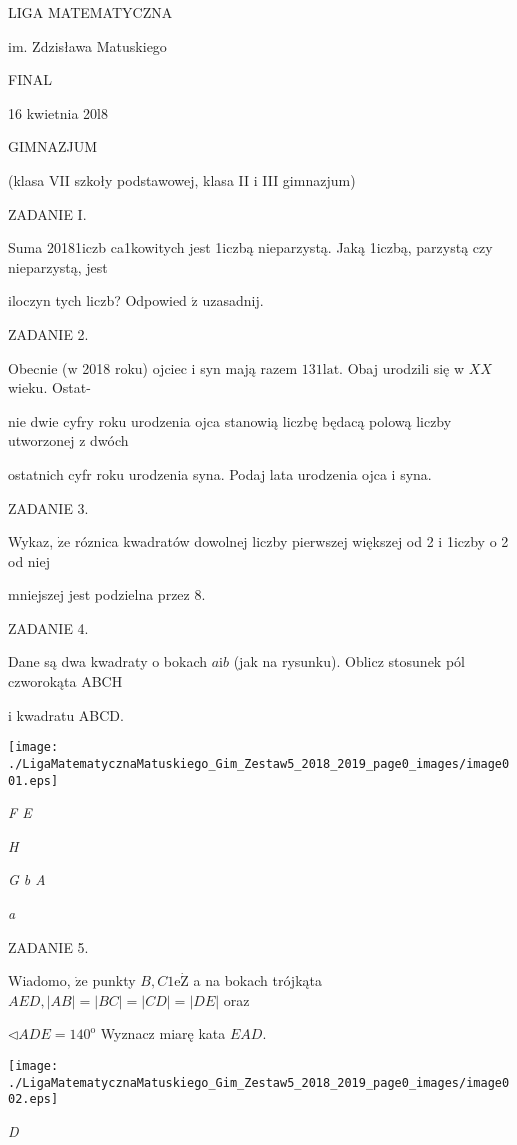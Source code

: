 \documentclass[a4paper,12pt]{article}
\begin{document}
LIGA MATEMATYCZNA

im. Zdzisława Matuskiego

FINAL

16 kwietnia 20l8

GIMNAZJUM

(klasa VII szkoły podstawowej, klasa II i III gimnazjum)

ZADANIE I.

Suma 20181iczb ca1kowitych jest 1iczbą nieparzystą. Jaką 1iczbą, parzystą czy nieparzystą, jest

iloczyn tych liczb? Odpowied $\acute{\mathrm{z}}$ uzasadnij.

ZADANIE 2.

Obecnie ($\mathrm{w}$ 2018 roku) ojciec i syn mają razem $131\mathrm{l}\mathrm{a}\mathrm{t}$. Obaj urodzili się w $XX$ wieku. Ostat-

nie dwie cyfry roku urodzenia ojca stanowią liczbę będacą polową liczby utworzonej z dwóch

ostatnich cyfr roku urodzenia syna. Podaj lata urodzenia ojca i syna.

ZADANIE 3.

Wykaz, $\dot{\mathrm{z}}\mathrm{e}$ róznica kwadratów dowolnej liczby pierwszej większej od 2 i 1iczby o 2 od niej

mniejszej jest podzielna przez 8.

ZADANIE 4.

Dane są dwa kwadraty o bokach $a\mathrm{i}b$ (jak na rysunku). Oblicz stosunek pól czworokąta ABCH

i kwadratu ABCD.
\begin{center}
\texttt{[image: ./LigaMatematycznaMatuskiego\_Gim\_Zestaw5\_2018\_2019\_page0\_images/image001.eps]}
\end{center}
{\it F E}

{\it H}

{\it G  b A}

{\it a}

ZADANIE 5.

Wiadomo, $\dot{\mathrm{z}}\mathrm{e}$ punkty $B, C1\mathrm{e}\dot{\mathrm{Z}}$ a na bokach trójkąta $AED, |AB| = |BC|=|CD|= |DE|$ oraz

$\triangleleft ADE=140^{\mathrm{o}}$ Wyznacz miarę kata $EAD.$
\begin{center}
\texttt{[image: ./LigaMatematycznaMatuskiego\_Gim\_Zestaw5\_2018\_2019\_page0\_images/image002.eps]}
\end{center}
{\it D}
\end{document}
